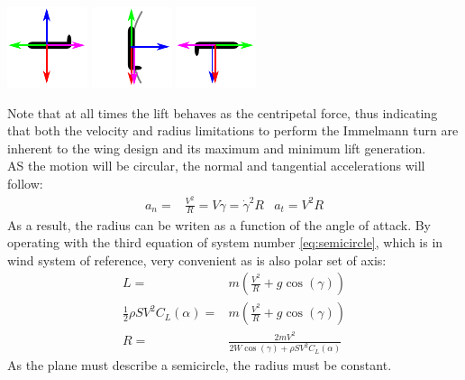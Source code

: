 	\includegraphics[width=0.3\linewidth]{figures/free-body-1.pdf} \hfill
	\label{fig:free-body-1}
		\includegraphics[width=0.3\linewidth]{figures/free-body-2.pdf}\hfill
	\label{fig:free-body-2}
		\includegraphics[width=0.3\linewidth]{figures/free-body-3.pdf}
	\label{fig:free-body-3}
	\vspace{0.5cm}
	\vspace{0.25cm}

Note that at all times the lift behaves as the centripetal force, thus indicating that both the velocity and radius limitations to perform the Immelmann turn are inherent to the wing design and its maximum and minimum lift generation.\\
AS the motion will be circular, the normal and tangential accelerations will follow:
\begin{align*}
	a_n=&\frac{V^2}{R}=V\dot{\gamma}=\dot{\gamma}^2R&a_t=V^2R
\end{align*}
As a result, the radius can be writen as a function of the angle of attack. By operating with the third equation of system number \ref{eq:semicircle}, which is in wind system of reference, very convenient as is also polar set of axis:
\begin{align*}
	L=&m\left(\frac{V^2}{R}+g\cos(\gamma)\right)\\
	\frac{1}{2}\rho S V^2 C_L(\alpha)=&m\left(\frac{V^2}{R}+g\cos(\gamma)\right)\\
	R=&\frac{2mV^2}{2W\cos(\gamma)+\rho S V^2 C_L(\alpha)}
\end{align*}
As the plane must describe a semicircle, the radius must be constant.

